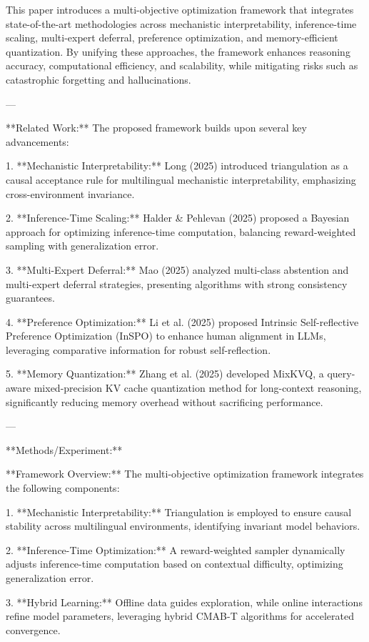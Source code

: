 This paper introduces a multi-objective optimization framework that integrates state-of-the-art methodologies across mechanistic interpretability, inference-time scaling, multi-expert deferral, preference optimization, and memory-efficient quantization. By unifying these approaches, the framework enhances reasoning accuracy, computational efficiency, and scalability, while mitigating risks such as catastrophic forgetting and hallucinations.

---

**Related Work:**  
The proposed framework builds upon several key advancements:  

1. **Mechanistic Interpretability:**  
   Long (2025) introduced triangulation as a causal acceptance rule for multilingual mechanistic interpretability, emphasizing cross-environment invariance.  

2. **Inference-Time Scaling:**  
   Halder & Pehlevan (2025) proposed a Bayesian approach for optimizing inference-time computation, balancing reward-weighted sampling with generalization error.  

3. **Multi-Expert Deferral:**  
   Mao (2025) analyzed multi-class abstention and multi-expert deferral strategies, presenting algorithms with strong consistency guarantees.  

4. **Preference Optimization:**  
   Li et al. (2025) proposed Intrinsic Self-reflective Preference Optimization (InSPO) to enhance human alignment in LLMs, leveraging comparative information for robust self-reflection.  

5. **Memory Quantization:**  
   Zhang et al. (2025) developed MixKVQ, a query-aware mixed-precision KV cache quantization method for long-context reasoning, significantly reducing memory overhead without sacrificing performance.  

---

**Methods/Experiment:**  

**Framework Overview:**  
The multi-objective optimization framework integrates the following components:  

1. **Mechanistic Interpretability:**  
   Triangulation is employed to ensure causal stability across multilingual environments, identifying invariant model behaviors.  

2. **Inference-Time Optimization:**  
   A reward-weighted sampler dynamically adjusts inference-time computation based on contextual difficulty, optimizing generalization error.  

3. **Hybrid Learning:**  
   Offline data guides exploration, while online interactions refine model parameters, leveraging hybrid CMAB-T algorithms for accelerated convergence.  

